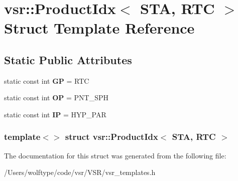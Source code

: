 \hypertarget{structvsr_1_1_product_idx_3_01_s_t_a_00_01_r_t_c_01_4}{\section{vsr\-:\-:Product\-Idx$<$ S\-T\-A, R\-T\-C $>$ Struct Template Reference}
\label{structvsr_1_1_product_idx_3_01_s_t_a_00_01_r_t_c_01_4}
}
\subsection*{Static Public Attributes}
\begin{DoxyCompactItemize}
\item 
\hypertarget{structvsr_1_1_product_idx_3_01_s_t_a_00_01_r_t_c_01_4_a423016f386f4b2f9a9130476804bb849}{static const int {\bfseries G\-P} = R\-T\-C}\label{structvsr_1_1_product_idx_3_01_s_t_a_00_01_r_t_c_01_4_a423016f386f4b2f9a9130476804bb849}

\item 
\hypertarget{structvsr_1_1_product_idx_3_01_s_t_a_00_01_r_t_c_01_4_a83b360ec97c23d8f8fe41bedf2ec96f3}{static const int {\bfseries O\-P} = P\-N\-T\-\_\-\-S\-P\-H}\label{structvsr_1_1_product_idx_3_01_s_t_a_00_01_r_t_c_01_4_a83b360ec97c23d8f8fe41bedf2ec96f3}

\item 
\hypertarget{structvsr_1_1_product_idx_3_01_s_t_a_00_01_r_t_c_01_4_a6363997ce7b505c4354bfe2e271d4ce7}{static const int {\bfseries I\-P} = H\-Y\-P\-\_\-\-P\-A\-R}\label{structvsr_1_1_product_idx_3_01_s_t_a_00_01_r_t_c_01_4_a6363997ce7b505c4354bfe2e271d4ce7}

\end{DoxyCompactItemize}
\subsubsection*{template$<$$>$ struct vsr\-::\-Product\-Idx$<$ S\-T\-A, R\-T\-C $>$}



The documentation for this struct was generated from the following file\-:\begin{DoxyCompactItemize}
\item 
/\-Users/wolftype/code/vsr/\-V\-S\-R/vsr\-\_\-templates.\-h\end{DoxyCompactItemize}

